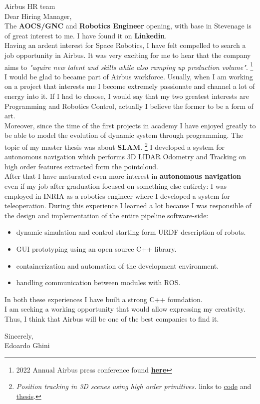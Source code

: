 \begin{FlushLeft}
Airbus HR team\\

\vspace{2cm}
Dear Hiring Manager,\\\smallskip
The \textbf{AOCS/GNC} and \textbf{Robotics Engineer} opening, with base in Stevenage is of great interest to me. I have found it on \textbf{Linkedin}.\\\smallskip
Having an ardent interest for Space Robotics, I have felt compelled to search a job opportunity in Airbus.
It was very exciting for me to hear that the company aims to \textit{"aquire new talent and skills while also ramping up production volume"}.
  \footnote{2022 Annual Airbus press conference found \href{https://simpleflying.com/airbus-720-delivery-target-2022/}{\textbf{here}}}\\\smallskip
I would be glad to became part of Airbus workforce.
Usually, when I am working on a project that interests me I become extremely passionate and channel a lot of energy into it.
If I had to choose, I would say that my two greatest interests are Programming and Robotics Control, actually I believe the former to be a form of art.\\\smallskip
Moreover, since the time of the first projects in academy I have enjoyed greatly  to be able to model the evolution of dynamic system through programming.
  The topic of my master thesis was about \textbf{SLAM}.
  \footnote{ \textit{Position tracking in 3D scenes using high order primitives.} \quad links to \href{https://github.com/dinies/3D-Lidar-Odometry-and-Tracking}{code} and  \href{https://github.com/dinies/MasterThesis-ArtificialIntelligence-Robotics/blob/master/MaterThesis_Edoardo_Ghini.pdf}{thesis}.}
I developed a system for autonomous navigation which performs 3D LIDAR Odometry and Tracking on high order features extracted form the pointcloud.\\\smallskip
After that I have maturated even more interest in \textbf{autonomous navigation } even if my job after graduation focused on something else entirely: I was employed in INRIA as a robotics engineer where I developed  a system for teleoperation.
During this experience I learned a lot because I was responsible of the design and implementation of the entire pipeline software-side:
\begin{itemize}
  \item  dynamic simulation and control starting form URDF description of robots.
  \item  GUI prototyping using an open source C++ library.
  \item  containerization and automation of the development environment.
  \item  handling communication between modules with ROS.
\end{itemize}
In both these experiences I have built a strong C++ foundation.\\\smallskip
I am seeking a working opportunity that would allow expressing my creativity.
Thus, I think that Airbus will be one of the best companies to find it.

\bigskip
Sincerely,\\
Edoardo Ghini
\end{FlushLeft}


